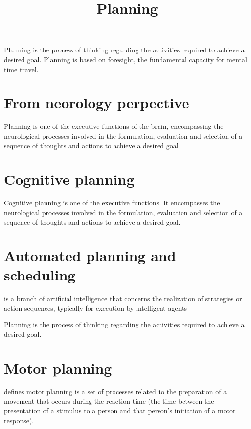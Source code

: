 \documentclass[a4paper]{article}
\title{Planning}
\date{}
\begin{document}
    \maketitle
    
    Planning is the process of thinking regarding the activities required to achieve a desired goal. Planning is based on foresight, the fundamental capacity for mental time travel. 
    
    
    \section{From neorology perpective}
        Planning is one of the executive functions of the brain, encompassing the neurological processes involved in the formulation, evaluation and selection of a sequence of thoughts and actions to achieve a desired goal
    
    
    \section{Cognitive planning}
        
        Cognitive planning is one of the executive functions. It encompasses the neurological processes involved in the formulation, evaluation and selection of a sequence of thoughts and actions to achieve a desired goal.
    
    
    \section{Automated planning and scheduling}
        is a branch of artificial intelligence that concerns the realization of strategies or action sequences, typically for execution by intelligent agents 
        
        Planning is the process of thinking regarding the activities required to achieve a desired goal. 
    
    
    \section{Motor planning}
         defines motor planning is a set of processes related to the preparation of a movement that occurs during the reaction time (the time between the presentation of a stimulus to a person and that person's initiation of a motor response).
    
\end{document}
